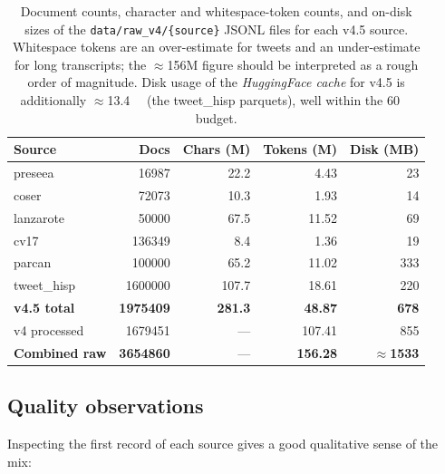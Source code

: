 \documentclass[11pt,a4paper]{article}
\begin{document}
\begin{table}[h]
\centering
\begin{tabular}{l r r r r}
\toprule
\textbf{Source} & \textbf{Docs} & \textbf{Chars (M)} & \textbf{Tokens (M)} & \textbf{Disk (MB)} \\
\midrule
preseea    & \num{16987}   & 22.2  & 4.43  & 23  \\
coser      & \num{72073}   & 10.3  & 1.93  & 14  \\
lanzarote  & \num{50000}   & 67.5  & 11.52 & 69  \\
cv17       & \num{136349}  & 8.4   & 1.36  & 19  \\
parcan     & \num{100000}  & 65.2  & 11.02 & 333 \\
tweet\_hisp& \num{1600000} & 107.7 & 18.61 & 220 \\
\midrule
\textbf{v4.5 total} & \textbf{\num{1975409}} & \textbf{281.3} & \textbf{48.87} & \textbf{678} \\
\midrule
v4 processed & \num{1679451} & --- & 107.41 & 855 \\
\midrule
\textbf{Combined raw} & \textbf{\num{3654860}} & --- & \textbf{156.28} & \textbf{$\approx$1533} \\
\bottomrule
\end{tabular}
\caption{Document counts, character and whitespace-token counts, and
on-disk sizes of the \texttt{data/raw\_v4/\{source\}} JSONL files for
each v4.5 source. Whitespace tokens are an over-estimate for tweets and
an under-estimate for long transcripts; the $\approx$156M figure should
be interpreted as a rough order of magnitude. Disk usage of the
\emph{HuggingFace cache} for v4.5 is additionally $\approx$\SI{13.4}{\giga\byte}
(the tweet\_hisp parquets), well within the \SI{60}{\giga\byte}
budget.}
\label{tab:tokens}
\end{table}

\subsection{Quality observations}

Inspecting the first record of each source gives a good qualitative
sense of the mix:
\end{document}
